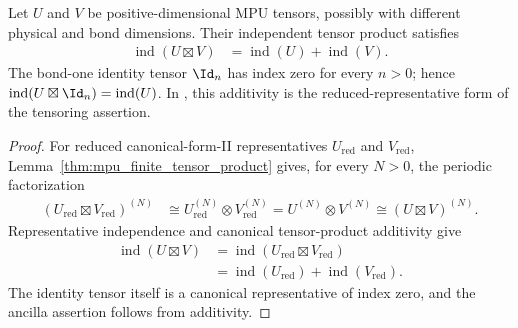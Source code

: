 \begin{lemma}
    \label{thm:mpu_representative_index_tensor_product}
    \leanok
    Let $U$ and $V$ be positive-dimensional MPU tensors, possibly with
    different physical and bond dimensions. Their independent tensor product
    satisfies
    \begin{align}
        \operatorname{ind}(U\boxtimes V)
         & =\operatorname{ind}(U)+\operatorname{ind}(V).
    \end{align}
    The bond-one identity tensor $\Id_n$ has index zero for every $n>0$;
    hence $\operatorname{ind}(U\boxtimes\Id_n)=\operatorname{ind}(U)$.
    In \cite[Theorem~IV.6(ii)]{Cirac2017MPU}, this additivity is the reduced-representative form of the tensoring
    assertion.
\end{lemma}

\begin{proof}\leanok
    For reduced canonical-form-II representatives $U_{\mathrm{red}}$ and
    $V_{\mathrm{red}}$, Lemma~\ref{thm:mpu_finite_tensor_product} gives, for every $N>0$,
    the periodic factorization
    \begin{align}
        (U_{\mathrm{red}}\boxtimes V_{\mathrm{red}})^{(N)}
         & \cong U_{\mathrm{red}}^{(N)}\otimes V_{\mathrm{red}}^{(N)}
        = U^{(N)}\otimes V^{(N)}
        \cong (U\boxtimes V)^{(N)}.
    \end{align}
    Representative independence and canonical tensor-product additivity give
    \begin{align}
        \operatorname{ind}(U\boxtimes V)
         & =\operatorname{ind}(U_{\mathrm{red}}\boxtimes V_{\mathrm{red}}) \\
         & =\operatorname{ind}(U_{\mathrm{red}})
        +\operatorname{ind}(V_{\mathrm{red}}).
    \end{align}
    The identity tensor itself is a canonical representative of index zero,
    and the ancilla assertion follows from additivity.
\end{proof}

